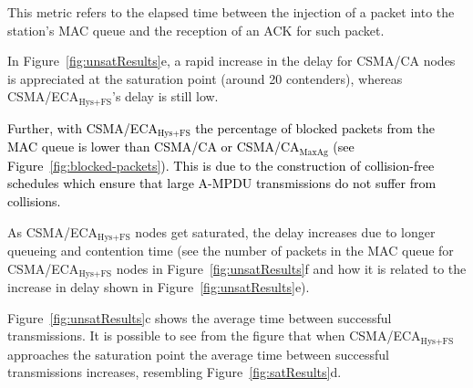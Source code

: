 	This metric refers to the elapsed time between the injection of a packet into the station's MAC queue and the reception of an ACK for such packet. 
	
	In Figure~\ref{fig:unsatResults}e, a rapid increase in the delay for CSMA/CA nodes is appreciated at the saturation point (around 20 contenders), whereas CSMA/ECA$_{\text{Hys+FS}}$'s delay is still low. 
	
	\textcolor{black}{Further, with CSMA/ECA$_{\text{Hys+FS}}$ the percentage of blocked packets from the MAC queue is lower than CSMA/CA or CSMA/CA$_{\text{MaxAg}}$ (see Figure~\ref{fig:blocked-packets}). This is due to the construction of collision-free schedules which ensure that large A-MPDU transmissions do not suffer from collisions.}
	
	As CSMA/ECA$_{\text{Hys+FS}}$ nodes get saturated, the delay increases due to longer queueing and contention time (see the number of packets in the MAC queue for CSMA/ECA$_{\text{Hys+FS}}$ nodes in Figure~\ref{fig:unsatResults}f and how it is related to the increase in delay shown in Figure~\ref{fig:unsatResults}e).
	
	
	Figure~\ref{fig:unsatResults}c shows the average time between successful transmissions. It is possible to see from the figure that when CSMA/ECA$_{\text{Hys+FS}}$ approaches the saturation point the average time between successful transmissions increases, resembling Figure~\ref{fig:satResults}d. 
	
